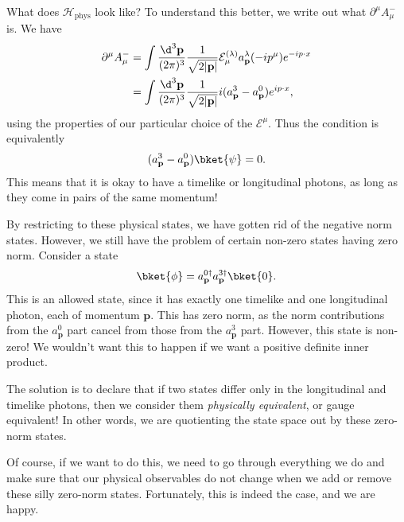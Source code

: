 \documentclass[a4paper]{article}
\begin{document}
What does $\mathcal{H}_{\mathrm{phys}}$ look like? To understand this better, we write out what $\partial^\mu A_\mu^-$ is. We have
\begin{align*}
  \partial^\mu A_\mu^- &= \int \frac{\d^3 \mathbf{p}}{(2\pi)^3} \frac{1}{\sqrt{2|\mathbf{p}|}} \mathcal{E}_\mu^{(\lambda)} a_\mathbf{p}^{\lambda} (-ip^\mu) e^{-ip\cdot x}\\
  &= \int \frac{\d^3 \mathbf{p}}{(2\pi)^3} \frac{1}{\sqrt{2|\mathbf{p}|}} i(a_\mathbf{p}^3 - a_\mathbf{p}^0) e^{ip\cdot x},
\end{align*}
using the properties of our particular choice of the $\mathcal{E}^\mu$. Thus the condition is equivalently
\[
  (a_\mathbf{p}^3 - a_\mathbf{p}^0)\bket{\psi} = 0.
\]
This means that it is okay to have a timelike or longitudinal photons, as long as they come in pairs of the same momentum!

By restricting to these physical states, we have gotten rid of the negative norm states. However, we still have the problem of certain non-zero states having zero norm. Consider a state
\[
  \bket{\phi} = a_\mathbf{p}^{0\dagger} a_\mathbf{p}^{3\dagger}\bket{0}.
\]
This is an allowed state, since it has exactly one timelike and one longitudinal photon, each of momentum $\mathbf{p}$. This has zero norm, as the norm contributions from the $a_\mathbf{p}^0$ part cancel from those from the $a_\mathbf{p}^3$ part. However, this state is non-zero! We wouldn't want this to happen if we want a positive definite inner product.

The solution is to declare that if two states differ only in the longitudinal and timelike photons, then we consider them \emph{physically equivalent}, or gauge equivalent! In other words, we are quotienting the state space out by these zero-norm states.

Of course, if we want to do this, we need to go through everything we do and make sure that our physical observables do not change when we add or remove these silly zero-norm states. Fortunately, this is indeed the case, and we are happy.
\end{document}
